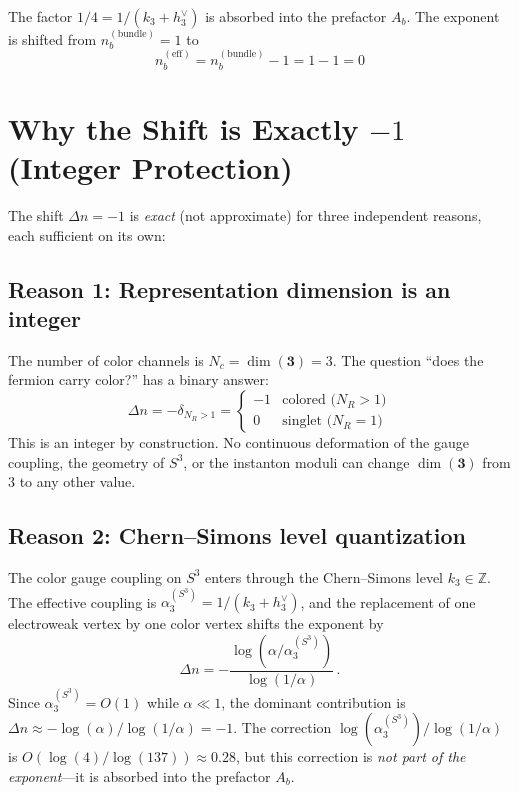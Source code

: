 \documentclass[11pt,a4paper]{article}
\newcommand{\Z}{\mathbb{Z}}
\theoremstyle{definition}
\theoremstyle{remark}
\begin{document}
The factor $1/4 = 1/(k_3 + h_3^\vee)$ is absorbed into the prefactor
$A_b$.  The exponent is shifted from $n_b^{(\text{bundle})} = 1$ to
\begin{equation}\label{eq:nb-final}
\boxed{n_b^{(\text{eff})} = n_b^{(\text{bundle})} - 1 = 1 - 1 = 0}
\end{equation}

\section{Why the Shift is Exactly $-1$ (Integer Protection)}
\label{sec:integer}

The shift $\Delta n = -1$ is \emph{exact} (not approximate) for three
independent reasons, each sufficient on its own:

\subsection{Reason 1: Representation dimension is an integer}

The number of color channels is $N_c = \dim(\mathbf{3}) = 3$.  The
question ``does the fermion carry color?'' has a binary answer:
\begin{equation}\label{eq:binary}
\Delta n = -\delta_{N_R > 1} =
\begin{cases} -1 & \text{colored ($N_R > 1$)} \\
0 & \text{singlet ($N_R = 1$)} \end{cases}
\end{equation}
This is an integer by construction.  No continuous deformation of the
gauge coupling, the geometry of $S^3$, or the instanton moduli can
change $\dim(\mathbf{3})$ from 3 to any other value.

\subsection{Reason 2: Chern--Simons level quantization}

The color gauge coupling on $S^3$ enters through the Chern--Simons
level $k_3 \in \Z$.  The effective coupling is
$\alpha_3^{(S^3)} = 1/(k_3 + h_3^\vee)$, and the replacement of one
electroweak vertex by one color vertex shifts the exponent by
\begin{equation}
\Delta n = -\frac{\log(\alpha/\alpha_3^{(S^3)})}{\log(1/\alpha)}\,.
\end{equation}
Since $\alpha_3^{(S^3)} = O(1)$ while $\alpha \ll 1$, the dominant
contribution is $\Delta n \approx -\log(\alpha)/\log(1/\alpha) = -1$.
The correction $\log(\alpha_3^{(S^3)})/\log(1/\alpha)$ is
$O(\log(4)/\log(137)) \approx 0.28$, but this correction is
\emph{not part of the exponent}---it is absorbed into the prefactor $A_b$.
\end{document}
